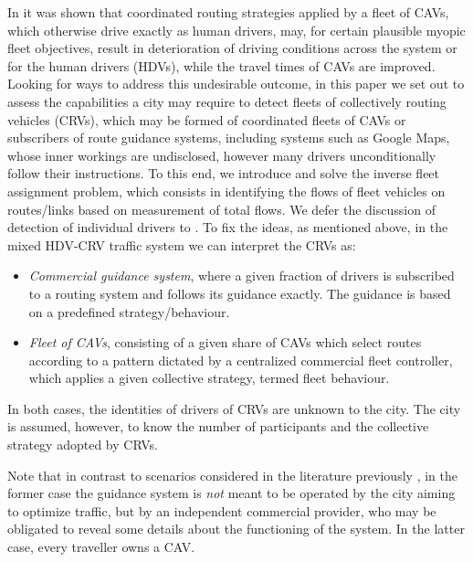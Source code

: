 \documentclass[a4paper,11pt]{article}
\begin{document}
In \cite{JamrozSciRep} it was shown that coordinated routing strategies applied by a fleet of CAVs, which otherwise drive exactly as human drivers, may, for certain plausible myopic fleet objectives, result in deterioration of driving conditions across the system or for the human drivers (HDVs), while the travel times of CAVs are improved. Looking for ways to address this undesirable outcome, in this paper we set out to assess the capabilities a city may require to detect fleets of collectively routing vehicles (CRVs), which may be formed of coordinated fleets of CAVs or subscribers of route guidance systems, including systems such as Google Maps,  whose inner workings are undisclosed, however many drivers unconditionally follow their instructions.
To this end, we introduce and solve the inverse fleet assignment problem, which consists in identifying the flows of fleet vehicles on routes/links based on measurement of total flows. %
We defer the discussion of detection of individual drivers to \cite{JamrozDetectionInPrep}. To fix the ideas, as mentioned above, in the mixed HDV-CRV traffic system we can interpret the CRVs as:
\begin{itemize}
\item \emph {Commercial guidance system}, where a given fraction of drivers is subscribed to a routing system and follows its guidance exactly. The guidance is based on a predefined strategy/behaviour.
\item \emph {Fleet of CAVs}, consisting of a given share of CAVs which select routes according to a pattern dictated by a centralized commercial fleet controller, which applies a given collective strategy, termed fleet behaviour. 
\end{itemize}
In both cases, the identities of drivers of CRVs are unknown to the city. The city is assumed, however, to know the number of participants and the collective strategy adopted by CRVs. 


Note that in contrast to scenarios considered in the literature previously \cite{Kashmiri, VanVuren}, in the former case the guidance system is \emph{not} meant to be operated by the city aiming to optimize traffic, but by an independent commercial provider, who may be obligated to reveal some details about the functioning of the system. In the latter case, every traveller owns a CAV. 
\end{document}
